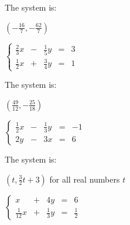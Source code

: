 \documentclass{ximera}
\begin{document}
\begin{question}
\begin{problem}
The system is:
\begin{multipleChoice}
\end{multipleChoice}


\begin{solution}
$\left(-\frac{16}{7}, -\frac{62}{7}\right)$  
\end{solution}
\end{problem}

\begin{problem}
$\left\{\begin{array}{ccccc}
      \frac{2}{3} x & - &\frac{1}{5}y&= &3 \\
	 \frac{1}{2}x& +&\frac{3}{4}y&=&1
    \end{array}\right.$


The system is:
\begin{multipleChoice}
\end{multipleChoice}

\begin{solution}
$\left(\frac{49}{12}, -\frac{25}{18}\right)$
\end{solution}
\end{problem}
  
\begin{problem}
$\left\{ \begin{array}{ccccr} \frac{1}{2}x & -& \frac{1}{3}y & = & -1  \\  2y&-&3x & = & 6 \end{array} \right.$ 


The system is:
\begin{multipleChoice}
\end{multipleChoice}

\begin{solution}
$\left(t, \frac{3}{2}t+3\right)$ for all real numbers $t$
\end{solution}
\end{problem}

\begin{problem}
$\left\{ \begin{array}{ccccr} x&+&4y & = & 6  \\  \frac{1}{12}x&+&\frac{1}{3}y& = & \frac{1}{2}  \end{array} \right.$



\end{problem}
\end{question}
\end{document}
